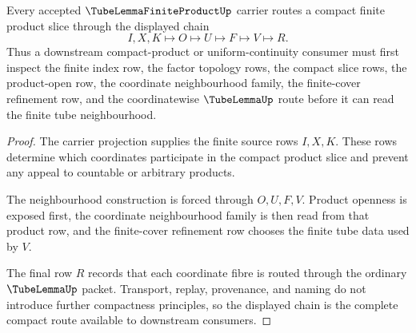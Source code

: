 \begin{theorem}
\label{thm:tube-lemma-finite-product-compact-route}
Every accepted $\TubeLemmaFiniteProductUp$ carrier routes a compact finite product slice through the displayed chain
$$
I,X,K\longmapsto O\longmapsto U\longmapsto F\longmapsto V\longmapsto R .
$$
Thus a downstream compact-product or uniform-continuity consumer must first inspect the finite index row, the factor topology rows, the compact slice rows, the product-open row, the coordinate neighbourhood family, the finite-cover refinement row, and the coordinatewise $\TubeLemmaUp$ route before it can read the finite tube neighbourhood.
\end{theorem}
\begin{proof}
The carrier projection supplies the finite source rows $I,X,K$. These rows determine which coordinates participate in the compact product slice and prevent any appeal to countable or arbitrary products.

The neighbourhood construction is forced through $O,U,F,V$. Product openness is exposed first, the coordinate neighbourhood family is then read from that product row, and the finite-cover refinement row chooses the finite tube data used by $V$.

The final row $R$ records that each coordinate fibre is routed through the ordinary $\TubeLemmaUp$ packet. Transport, replay, provenance, and naming do not introduce further compactness principles, so the displayed chain is the complete compact route available to downstream consumers.
\end{proof}


\begin{closurestatus}{\TubeLemmaFiniteProductUp}
  \theoryclosure{\seedClosure}
  \formalstatus{\encodedDefV}
\end{closurestatus}
